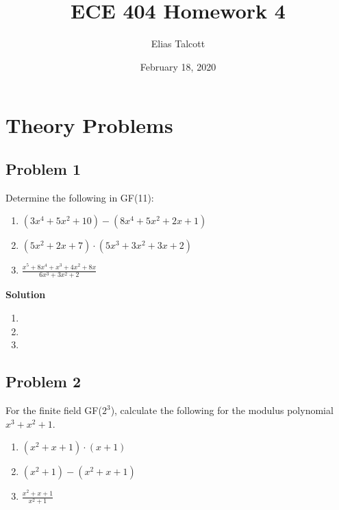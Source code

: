 \documentclass[11pt]{article}
\def \myTitle {ECE 404 Homework 4}
\def \myName {Elias Talcott}
\def \myDate {February 18, 2020}
\begin{document}
\begin{titlepage}
\title{\myTitle}
\author{\myName}
\date{\myDate}
\maketitle
\vspace{1in}
\tableofcontents
\thispagestyle{empty}
\end{titlepage}

\section{Theory Problems}

\subsection{Problem 1}
Determine the following in GF(11):

\begin{enumerate}[label=(\alph*)]
\item $(3x^4 + 5x^2 + 10) - (8x^4 + 5x^2 + 2x + 1)$
\item $(5x^2 + 2x + 7) \cdot (5x^3 + 3x^2 + 3x + 2)$
\item $\displaystyle{\frac{x^5 + 8x^4 + x^3 + 4x^2 + 8x}{6x^3 + 3x^2 + 2}}$
\end{enumerate}

\textbf{Solution}

\begin{enumerate}[label=(\alph*)]
\item
\item
\item
\end{enumerate}

\pagebreak

\subsection{Problem 2}
For the finite field GF($2^3$), calculate the following for the modulus polynomial $x^3+x^2+1$.

\begin{enumerate}[label=(\alph*)]
\item $(x^2+x+1) \cdot (x + 1)$
\item $(x^2 + 1) - (x^2 + x + 1)$
\item $\displaystyle{\frac{x^2 + x + 1}{x^2 + 1}}$
\end{enumerate}
\end{document}
